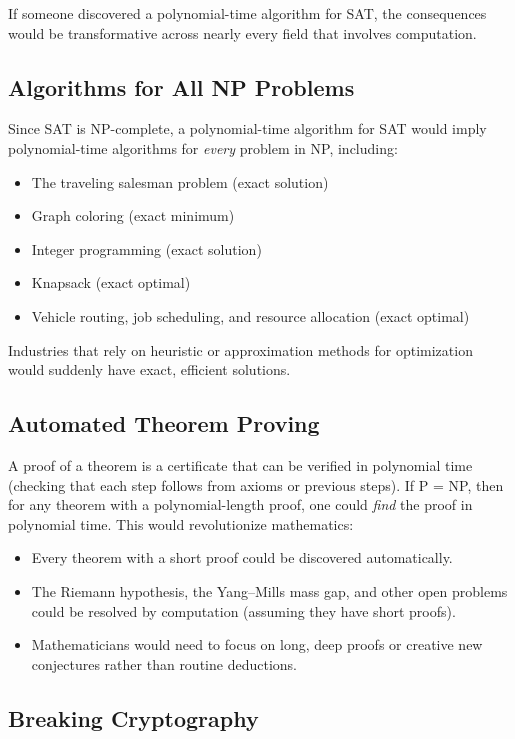 If someone discovered a polynomial-time algorithm for SAT, the consequences would be transformative across nearly every field that involves computation.

\subsection{Algorithms for All NP Problems}

Since SAT is NP-complete, a polynomial-time algorithm for SAT would imply polynomial-time algorithms for \emph{every} problem in NP, including:
\begin{itemize}
  \item The traveling salesman problem (exact solution)
  \item Graph coloring (exact minimum)
  \item Integer programming (exact solution)
  \item Knapsack (exact optimal)
  \item Vehicle routing, job scheduling, and resource allocation (exact optimal)
\end{itemize}

Industries that rely on heuristic or approximation methods for optimization would suddenly have exact, efficient solutions.

\subsection{Automated Theorem Proving}

A proof of a theorem is a certificate that can be verified in polynomial time (checking that each step follows from axioms or previous steps). If P = NP, then for any theorem with a polynomial-length proof, one could \emph{find} the proof in polynomial time. This would revolutionize mathematics:
\begin{itemize}
  \item Every theorem with a short proof could be discovered automatically.
  \item The Riemann hypothesis, the Yang--Mills mass gap, and other open problems could be resolved by computation (assuming they have short proofs).
  \item Mathematicians would need to focus on long, deep proofs or creative new conjectures rather than routine deductions.
\end{itemize}

\subsection{Breaking Cryptography}

